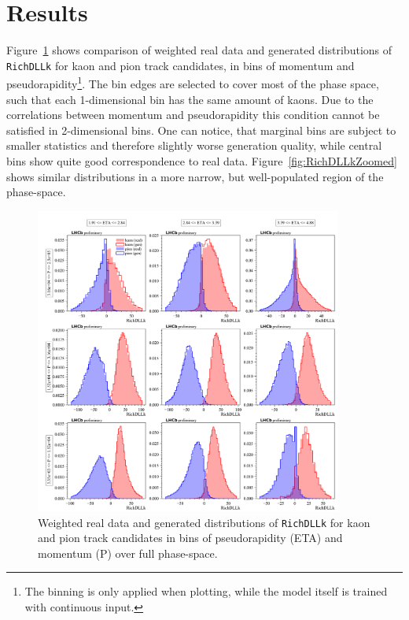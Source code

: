 \documentclass[a4paper]{jpconf}
\begin{document}
\section{Results}

Figure~\ref{fig:RichDLLk} shows comparison of weighted real data and generated distributions of \texttt{RichDLLk} for kaon and pion track candidates, in bins of momentum and pseudorapidity\footnote{The binning is only applied when plotting, while the model itself is trained with continuous input.}. The bin edges are selected to cover most of the phase space, such that each 1-dimensional bin has the same amount of kaons. Due to the correlations between momentum and pseudorapidity this condition cannot be satisfied in 2-dimensional bins. One can notice, that marginal bins are subject to smaller statistics and therefore slightly worse generation quality, while central bins show quite good correspondence to real data. Figure~\ref{fig:RichDLLkZoomed} shows similar distributions in a more narrow, but well-populated region of the phase-space.

\begin{figure}
    \centering
    \includegraphics[width=0.9\textwidth]{kaon_vs_pion_RichDLLk_in_Brunel_P_vs_Brunel_ETA_3x3_full.pdf}
    \caption{Weighted real data and generated distributions of \texttt{RichDLLk} for kaon and pion track candidates in bins of pseudorapidity (ETA) and momentum (P) over full phase-space.}
    \label{fig:RichDLLk}
\end{figure}
\end{document}
